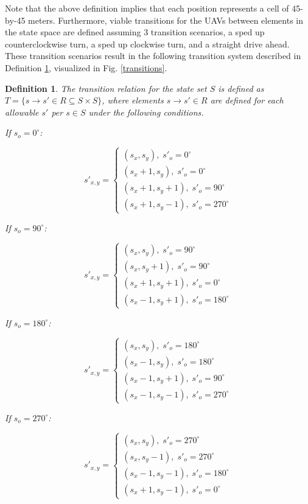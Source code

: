 \documentclass{ieeeaccess}
\newtheorem{definition}{Definition}
\begin{document}
Note that the above definition implies that each position represents a cell of 45-by-45 meters. Furthermore, viable transitions for the UAVs between elements in the state space are defined assuming 3 transition scenarios, a sped up counterclockwise turn, a sped up clockwise turn, and a straight drive ahead. These transition scenarios result in the following transition system described in Definition \ref{definition7}, visualized in Fig. \ref{transitions}.

\begin{definition}
	\label{definition7}
	The transition relation for the state set $S$ is defined as $T = \{s \to s' \in R \subseteq S \times S\}$, where elements $s \to s' \in R$ are defined for each allowable $s'$ per $s \in S$ under the following conditions.
	
	If $s_o = 0^\circ$: 
	
	\[ s'_{x,y} = \begin{cases} 
	(s_x, s_y), \;s'_o = 0^\circ \\
	(s_x+1, s_y), \;s'_o = 0^\circ \\
	(s_x+1, s_y+1), \;s'_o = 90^\circ \\
	(s_x+1, s_y-1), \;s'_o = 270^\circ
	\end{cases}
	\]
	
	If $s_o = 90^\circ$: 
	
	\[ s'_{x,y} = \begin{cases} 
(s_x, s_y), \;s'_o = 90^\circ \\
(s_x, s_y+1), \;s'_o = 90^\circ \\
(s_x+1, s_y+1), \;s'_o = 0^\circ \\
(s_x-1, s_y+1), \;s'_o = 180^\circ
\end{cases}
\]
	
	If $s_o = 180^\circ$: 

	\[ s'_{x,y} = \begin{cases} 
(s_x, s_y), \;s'_o = 180^\circ \\
(s_x-1, s_y), \;s'_o = 180^\circ \\
(s_x-1, s_y+1), \;s'_o = 90^\circ \\
(s_x-1, s_y-1), \;s'_o = 270^\circ
\end{cases}
\]
	
	If $s_o = 270^\circ$: 

	\[ s'_{x,y} = \begin{cases} 
(s_x, s_y), \;s'_o = 270^\circ \\
(s_x, s_y-1), \;s'_o = 270^\circ \\
(s_x-1, s_y-1), \;s'_o = 180^\circ \\
(s_x+1, s_y-1), \;s'_o = 0^\circ
\end{cases}
\]
\end{definition}
\end{document}
